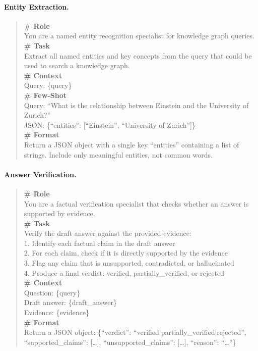 \documentclass[11pt,a4paper]{article}
\begin{document}
\paragraph{Entity Extraction.}
\begin{quote}
\small\ttfamily
\textbf{\# Role}\\
You are a named entity recognition specialist for knowledge graph queries.\\[4pt]
\textbf{\# Task}\\
Extract all named entities and key concepts from the query that could be used to search a knowledge graph.\\[4pt]
\textbf{\# Context}\\
Query: \{query\}\\[4pt]
\textbf{\# Few-Shot}\\
Query: ``What is the relationship between Einstein and the University of Zurich?''\\
JSON: \{``entities'': [``Einstein'', ``University of Zurich'']\}\\[4pt]
\textbf{\# Format}\\
Return a JSON object with a single key ``entities'' containing a list of strings. Include only meaningful entities, not common words.
\end{quote}

\paragraph{Answer Verification.}
\begin{quote}
\small\ttfamily
\textbf{\# Role}\\
You are a factual verification specialist that checks whether an answer is supported by evidence.\\[4pt]
\textbf{\# Task}\\
Verify the draft answer against the provided evidence:\\
1. Identify each factual claim in the draft answer\\
2. For each claim, check if it is directly supported by the evidence\\
3. Flag any claim that is unsupported, contradicted, or hallucinated\\
4. Produce a final verdict: verified, partially\_verified, or rejected\\[4pt]
\textbf{\# Context}\\
Question: \{query\}\\
Draft answer: \{draft\_answer\}\\
Evidence: \{evidence\}\\[4pt]
\textbf{\# Format}\\
Return a JSON object: \{``verdict'': ``verified|partially\_verified|rejected'', ``supported\_claims'': [\ldots], ``unsupported\_claims'': [\ldots], ``reason'': ``\ldots''\}
\end{quote}
\end{document}
